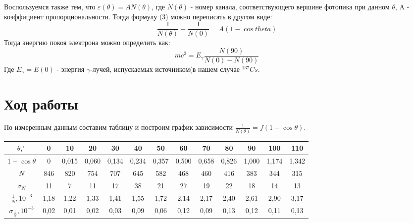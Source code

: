 \documentclass[a4paper,12pt]{article}
\begin{document}
Воспользуемся также тем, что $\varepsilon(\theta) = A N(\theta)$, где $N(\theta)$ - номер канала, соответствующего вершине фотопика при данном $\theta$, A - коэффициент пропорциональности. Тогда формулу (3) можно переписать в другом виде:
\begin{equation}
\frac{1}{N(\theta)} - \frac{1}{N(0)} = A(1-\cos{theta})
\end{equation}
Тогда энергию покоя электрона можно определить как:
\begin{equation}
mc^2 = E_\gamma \frac{N(90)}{N(0) - N(90)}
\end{equation}
Где $E_\gamma = E(0)$ - энергия $\gamma$-лучей, испускаемых источником(в нашем случае $^{137}Cs$.
\section{Ход работы}
По измеренным данным составим таблицу и построим график зависимости $\frac{1}{N(\theta)} = f(1-\cos{\theta})$.

\begin{table}[H]
\begin{tabular}{|c|c|c|c|c|c|c|c|c|c|c|c|c|}
\hline
$\theta, ^{\circ}$ & 0 & 10 & 20 & 30 & 40 & 50 & 60 & 70 & 80 & 90 & 100 & 110 \\
\hline
$1-\cos{\theta}$ & 0 & 0,015 & 0,060 & 0,134 & 0,234 & 0,357 & 0,500 & 0,658 & 0,826 & 1,000 & 1,174 & 1,342 \\
\hline
$N$ & 846 & 820 & 754 & 707 & 645 & 582 & 468 & 460 & 416 & 383 & 344 & 315 \\
\hline
$\sigma_N$ & 11 & 7 & 11 & 17 & 38 & 21 & 27 & 19 & 22 & 18 & 14 & 13 \\  
\hline
$\frac{1}{N}, 10^{-3}$ & 1,18 & 1,22 & 1,33 & 1,41 & 1,55 & 1,72 & 2,14 & 2,17 & 2,40 & 2,61 & 2,90 & 3,17 \\
\hline
$\sigma_{\frac{1}{N}}, 10^{-3}$ & 0,02 & 0,01 & 0,02 & 0,03 & 0,09 & 0,06 & 0,12 & 0,09 & 0,13 & 0,12 & 0,11 & 0,13  \\
\hline


\end{tabular}
\end{table}
\end{document}
